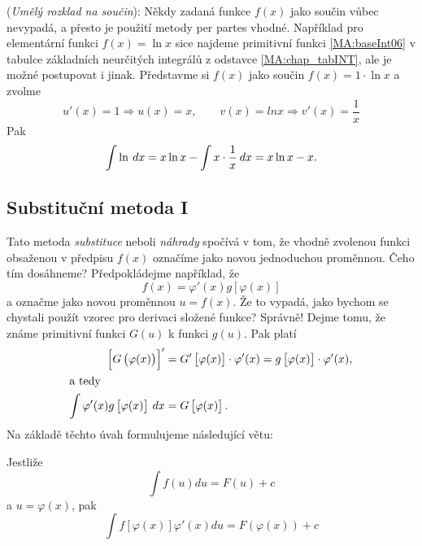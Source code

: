       \begin{example}
        (\emph{Umělý rozklad na součin}): Někdy zadaná funkce \(f(x)\) jako součin vůbec nevypadá, 
        a přesto je použití metody per partes vhodné. Například pro elementární funkci \(f(x) = \ln 
        x\) sice najdeme primitivní funkci \ref{MA:baseInt06} v tabulce základních neurčitých 
        integrálů z odstavce \ref{MA:chap_tabINT}, ale je možné postupovat i jinak. Představme si 
        \(f(x)\) jako součin \(f(x) = 1\cdot\ln x\) a zvolme \[u'(x) = 1 ⇒ u(x) = x, \qquad v(x) = 
        lnx ⇒ v'(x) = \frac{1}{x}\] Pak \[\int \ln\hspace{2pt}dx = x\ln x - \int x\cdot\frac{1}{x}\hspace{2pt}dx = x\ln 
        x - x.\]
      \end{example}
  
    \subsection{Substituční metoda I}
      Tato metoda \emph{substituce} neboli \emph{náhrady} spočívá v tom, že vhodně zvolenou funkci 
      obsaženou v předpisu \(f(x)\) označíme jako novou jednoduchou proměnnou. Čeho tím dosáhneme? 
      Předpokládejme například, že \[f(x)=\varphi'(x)g[\varphi(x)]\] a označme jako novou proměnnou 
      \(u = f(x)\). Že to vypadá, jako bychom se chystali použít vzorec pro derivaci složené 
      funkce? Správně! Dejme tomu, že známe primitivní funkci \(G(u)\) k funkci \(g(u)\). Pak platí
      \begin{align*}
       \left[G\left(\varphi(x)\right)\right]' 
          &= G'\left[\varphi(x)\right]\cdot\varphi'(x) =
             g\left[\varphi(x)\right]\cdot\varphi'(x),     \\
          \shortintertext{a tedy}
       \int \varphi'(x) g\left[\varphi(x)\right]\hspace{2pt}dx 
          &=  G\left[\varphi(x)\right]. 
      \end{align*}      
      Na základě těchto úvah formulujeme následující větu:
      \begin{lemma}
        Jestliže
        \begin{equation}\label{ma:eq_subst1}
          \int{f(u)du}=F(u)+c
        \end{equation}
        a $u=\varphi(x)$, pak
        \begin{equation}\label{ma:eq_subst2}
            \int{f[\varphi(x)]\varphi'(x)du}=F(\varphi(x))+c
        \end{equation}
      \end{lemma}
  

